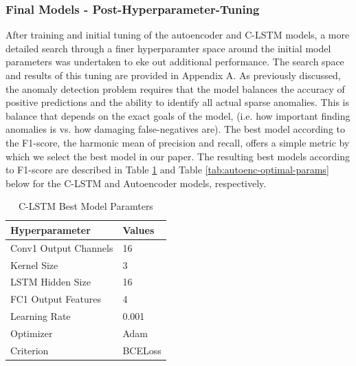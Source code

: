 \documentclass[10pt,twocolumn,letterpaper]{article}
\begin{document}
\subsubsection{Final Models - Post-Hyperparameter-Tuning}
After training and initial tuning of the autoencoder and C-LSTM models, a more detailed search through a finer hyperparamter space around the initial model parameters was undertaken to eke out additional performance. 
The search space and results of this tuning are provided in Appendix A. As previously discussed, the anomaly detection problem requires that the model balances the accuracy of positive predictions and the ability
to identify all actual sparse anomalies. This is balance that depends on the exact goals of the model, (i.e. how important finding anomalies is vs. how damaging false-negatives are). 
The best model according to the F1-score, the harmonic mean of precision and recall, offers a simple metric by which we select the best model in our paper. The resulting best models
according to F1-score are described in Table \ref{tab:clstm-optimal-params} and Table \ref{tab:autoenc-optimal-params} below for the C-LSTM and Autoencoder models, respectively.
\begin{table}[h]
   \centering
   \caption{C-LSTM Best Model Paramters}
   \label{tab:clstm-optimal-params}
   \begin{tabular}{|l|l|}
   \hline
   \textbf{Hyperparameter}   & \textbf{Values}         \\ \hline
   Conv1 Output Channels     & 16                 \\ \hline
   Kernel Size               & 3                  \\ \hline
   LSTM Hidden Size          & 16               \\ \hline
   FC1 Output Features       & 4              \\ \hline
   Learning Rate             & 0.001            \\ \hline
   Optimizer                 & Adam             \\ \hline
   Criterion                 & BCELoss                 \\ \hline
   \end{tabular}
   \end{table}
\end{document}
